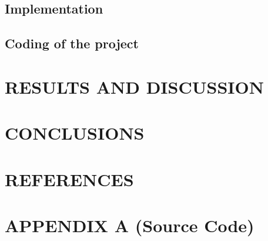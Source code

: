 \documentclass[12pt, final]{report}
\begin{document}
\section{Implementation}
\section{Coding of the project}

\chapter{RESULTS AND DISCUSSION}

\chapter{CONCLUSIONS}

\chapter*{REFERENCES}

\chapter*{APPENDIX A (Source Code)}
\end{document}
